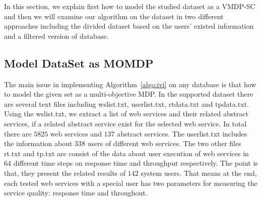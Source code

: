 \documentclass[10pt,journal,compsoc]{IEEEtran}
\begin{document}
In this section, we explain first how to model the studied dataset as a VMDP-SC and then we will examine our algorithm on the dataset in two different approaches including the divided dataset based on the users' existed information and  a filtered version of database. 

\subsection{Model DataSet as MOMDP}
The main issue in implementing Algorithm~\ref{algo:ivi} on any database is that how to model the given set as a multi-objective MDP. In the supported dataset \cite{10.1109/TSC.2012.34} there are several text files including wslist.txt, userlist.txt, rtdata.txt and tpdata.txt. Using the wslist.txt, we extract a list of web services and their related abstract services, if a related abstract service exist for the selected web service. In total there are $5825$ web services and $137$ abstract services. The userlist.txt includes the information about $338$ users of different web services. The two other files rt.txt and tp.txt are consist of the data about user execution of web services in $64$ different time steps on response time and throughput respectively. The point is that, they present the related results of $142$ system users. That means at the end, each tested web services with a special user has two parameters for measuring the service quality: response time and throughout. 
\end{document}

